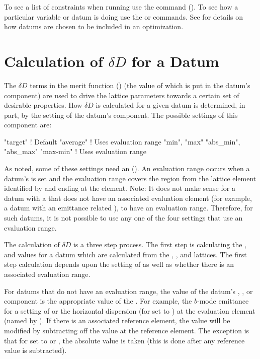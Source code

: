 To see a list of constraints when running \tao use the  command
(). To see how a particular variable or datum is doing use the  or
 commands.  See  for details on how datums are chosen to be
included in an optimization.

\section{Calculation of $\delta D$ for a Datum}
\label{s:del.d}

The $\delta D$ terms in the merit function () (the value of which is put in the datum's
 component) are used to drive the  lattice parameters towards a certain
set of desirable properties. How $\delta D$ is calculated for a given datum is determined, in part,
by the setting of the datum's  component. The possible settings of this component
are:
\begin{example}
  "target"                       ! Default
  "average"                      ! Uses evaluation range
  "min", "max"
  "abs_min", "abs_max"
  "max-min"                      ! Uses evaluation range
\end{example}
As noted, some of these settings need an  (). An evaluation
range occurs when a datum's  is set and the evaluation range covers the region
from the lattice element identified by  and ending at the  element.
Note: It does not make sense for a datum with a  that does not have an associated
evaluation element (for example, a datum with an emittance related ), to have an
evaluation range. Therefore, for such datums, it is not possible to use any one of the four
 settings that use an evaluation range.

The calculation of $\delta D$ is a three step process. The first step is calculating the
,  and  values for a datum which are calculated from the ,
, and  lattices. The first step calculation depends upon the setting of
 as well as whether there is an associated evaluation range.

For datums that do not have an evaluation range, the value of the datum's , , or
 component is the appropriate value of the . For example, the $b$-mode
emittance for a  setting of  or the horizontal dispersion (for
 set to ) at the evaluation element (named by ). If there is
an associated reference element, the value will be modified by subtracting off the 
value at the reference element. The exception is that for  set to  or
, the absolute value is taken (this is done after any reference value is subtracted).


